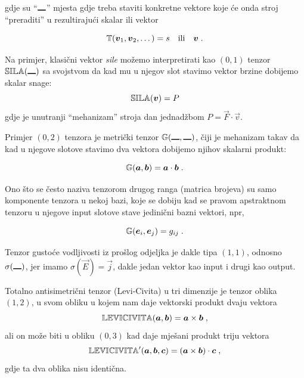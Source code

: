 gdje su ``$\rule{1em}{1pt}$'' mjesta gdje treba staviti konkretne vektore
koje će onda stroj ``preraditi'' u rezultirajući skalar ili vektor

\begin{equation}
   \bbtensor{T}(\vec{v}_1, \vec{v}_2, \dots) = s \quad \text{ili} \quad \vec{v} \;.
\end{equation}

Na primjer, klasični vektor \emph{sile} možemo interpretirati kao
$(0, 1)$ tenzor $\bbtensor{SILA}(\slot)$ sa svojstvom da kad mu
u njegov slot stavimo vektor brzine dobijemo skalar snage:
\begin{equation}
   \bbtensor{SILA}(\vec{v}) = P
\end{equation}
gdje je unutranji ``mehanizam'' stroja dan jednadžbom $P = \vec{F}\cdot\vec{v}$.

Primjer $(0,2)$ tenzora je metrički tenzor $\bbtensor{G}(\slot, \slot)$,
čiji je mehanizam takav da kad u njegove slotove stavimo dva vektora
dobijemo njihov skalarni produkt:

\begin{equation}
   \bbtensor{G}(\vec{a}, \vec{b}) = \vec{a}\cdot\vec{b} \;.
\end{equation}

Ono što se često naziva tenzorom drugog ranga (matrica brojeva) su
samo komponente tenzora u nekoj bazi, koje se
dobiju kad se pravom apstraktnom tenzoru u njegove input slotove
stave jedinični bazni vektori, npr,

\begin{equation}
   \bbtensor{G}(\vec{e}_i, \vec{e}_j) = g_{ij} \;.
\label{eq:Gkomponente}
\end{equation}

Tenzor gustoće vodljivosti iz prošlog odjeljka je dakle
tipa $(1,1)$, odnosno $\sigma(\slot)$, jer imamo
$\sigma(\vec{E}) = \vec{j}$, dakle jedan vektor kao input
i drugi kao output.

Totalno antisimetrični tenzor (Levi-Civita) u tri dimenzije je
tenzor oblika $(1, 2)$, u svom obliku u kojem nam daje
vektorski produkt dvaju vektora
\begin{equation}
   \bbtensor{LEVICIVITA}(\vec{a}, \vec{b}) = \vec{a}\times\vec{b} \;,
\end{equation}
ali on može biti u obliku $(0, 3)$ kad daje mješani produkt 
triju vektora
\begin{equation}
   \bbtensor{LEVICIVITA}'(\vec{a}, \vec{b}, \vec{c}) =
 (\vec{a}\times\vec{b})\cdot\vec{c} \;,
\end{equation}
gdje ta dva oblika nisu identična.

